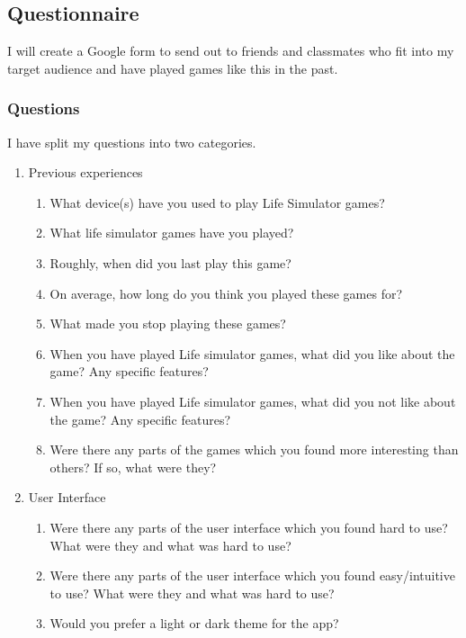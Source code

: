 \subsection{Questionnaire}
I will create a Google form to send out to friends and classmates who fit into my target audience and have played games like this in the past.
\subsubsection{Questions}
I have split my questions into two categories.
\begin{enumerate}
    \item Previous experiences
    \begin{enumerate}
        \item What device(s) have you used to play Life Simulator games?
        \item What life simulator games have you played?
        \item Roughly, when did you last play this game?
        \item On average, how long do you think you played these games for?
        \item What made you stop playing these games?
        \item When you have played Life simulator games, what did you like about the game? Any specific features?
        \item When you have played Life simulator games, what did you not like about the game? Any specific features?
        \item Were there any parts of the games which you found more interesting than others? If so, what were they?
    \end{enumerate}
    \item User Interface
    \begin{enumerate}
        \item Were there any parts of the user interface which you found hard to use? What were they and what was hard to use?
        \item Were there any parts of the user interface which you found easy/intuitive to use? What were they and what was hard to use?
        \item Would you prefer a light or dark theme for the app?
    \end{enumerate}
\end{enumerate}
